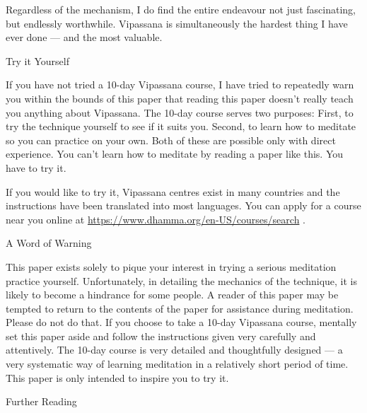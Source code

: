\documentclass{article}
\begin{document}
Regardless of the mechanism, I do find the entire endeavour not just fascinating, but
endlessly worthwhile. Vipassana is simultaneously the hardest thing I have ever done
--- and the most valuable.

\pagebreak

\begin{center}
  \Huge{Try it Yourself}
\end{center}

If you have not tried a 10-day Vipassana course, I have tried to repeatedly warn you
within the bounds of this paper that reading this paper doesn't really teach you
anything about Vipassana. The 10-day course serves two purposes: First, to try the
technique yourself to see if it suits you. Second, to learn how to meditate so you
can practice on your own. Both of these are possible only with direct experience. You
can't learn how to meditate by reading a paper like this. You have to try it.

If you would like to try it, Vipassana centres exist in many countries and the
instructions have been translated into most languages. You can apply for a course
near you online at \url{https://www.dhamma.org/en-US/courses/search} \cite{dhamma}.

\vspace{1cm}

\begin{center}
  \LARGE{A Word of Warning}
\end{center}

This paper exists solely to pique your interest in trying a serious meditation
practice yourself. Unfortunately, in detailing the mechanics of the technique, it is
likely to become a hindrance for some people. A reader of this paper may be tempted
to return to the contents of the paper for assistance during meditation. Please do
not do that. If you choose to take a 10-day Vipassana course, mentally set this paper
aside and follow the instructions given very carefully and attentively. The 10-day
course is very detailed and thoughtfully designed --- a very systematic way of
learning meditation in a relatively short period of time. This paper is only intended
to inspire you to try it.

\pagebreak

\begin{center}
  \Huge{Further Reading}
\end{center}

\vspace{1cm}
\end{document}
